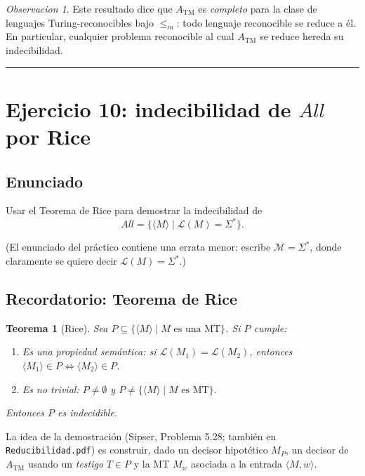 \documentclass[11pt,a4paper]{article}
\theoremstyle{plain}
\newtheorem{teorema}{Teorema}[section]
\theoremstyle{definition}
\theoremstyle{remark}
\newtheorem*{observacion}{Observacion}
\newcommand{\TM}{\mathrm{TM}}
\newcommand{\enc}[1]{\langle #1\rangle}
\newcommand{\encMw}{\langle M, w\rangle}
\newcommand{\lang}{\mathcal{L}}
\newcommand{\Sstar}{\Sigma^{*}}
\newcommand{\redm}{\le_{m}}
\newcommand{\ATM}{A_{\TM}}
\newcommand{\ALL}{\mathit{All}}
\begin{document}
\begin{observacion}
Este resultado dice que $\ATM$ es \emph{completo} para la clase de
lenguajes Turing-reconocibles bajo $\redm$: todo lenguaje reconocible se
reduce a \'el. En particular, cualquier problema reconocible al cual
$\ATM$ se reduce hereda su indecibilidad.
\end{observacion}

\bigskip\hrule\bigskip

\section{Ejercicio 10: indecibilidad de $\ALL$ por Rice}
\label{sec:ej10}

\subsection*{Enunciado}

Usar el Teorema de Rice para demostrar la indecibilidad de
\[
  \ALL = \{\enc{M} \mid \lang(M)=\Sstar\}.
\]

(El enunciado del pr\'actico contiene una errata menor: escribe
$\mathcal M=\Sstar$, donde claramente se quiere decir $\lang(M)=\Sstar$.)

\subsection*{Recordatorio: Teorema de Rice}

\begin{teorema}[Rice]
\label{teo:rice}
Sea $P\subseteq\{\enc{M} \mid M \text{ es una MT}\}$. Si $P$ cumple:
\begin{enumerate}
  \item \emph{Es una propiedad sem\'antica}: si $\lang(M_1)=\lang(M_2)$,
        entonces $\enc{M_1}\in P \iff \enc{M_2}\in P$.
  \item \emph{Es no trivial}: $P\neq\emptyset$ y $P\neq\{\enc{M}\mid M
        \text{ es MT}\}$.
\end{enumerate}
Entonces $P$ es indecidible.
\end{teorema}

La idea de la demostraci\'on (Sipser, Problema 5.28; tambi\'en en
\texttt{Reducibilidad.pdf}) es construir, dado un decisor hipot\'etico
$M_P$, un decisor de $\ATM$ usando un \emph{testigo} $T\in P$ y la MT
$M_w$ asociada a la entrada $\encMw$.
\end{document}
